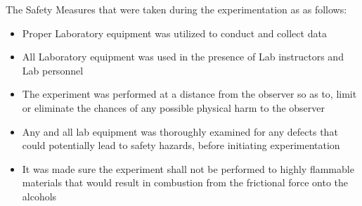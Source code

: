 

{The Safety Measures that were taken during the experimentation as as follows:}

	\begin{itemize}
		\item {Proper Laboratory equipment was utilized to conduct and collect data}
		\item {All Laboratory equipment was used in the presence of Lab instructors and Lab personnel}
		\item {The experiment was performed at a distance from the observer so as to, limit or eliminate the chances of any possible physical harm to the observer}
		\item {Any and all lab equipment was thoroughly examined for any defects that could potentially lead to safety hazards, before initiating experimentation}
		\item {It was made sure the experiment shall not be performed to highly flammable materials that would result in combustion from the frictional force onto the alcohols}
	\end{itemize}

